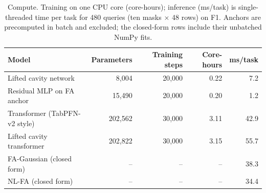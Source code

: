 \begin{table}[h]
\centering\small
\caption{\label{tab:compute}Compute. Training on one CPU core (core-hours); inference (ms/task) is single-threaded time per task for 480 queries (ten masks $\times$ 48 rows) on F1. Anchors are precomputed in batch and excluded; the closed-form rows include their unbatched NumPy fits.}
\begin{tabular}{lrrrr}
\toprule
Model & Parameters & Training steps & Core-hours & ms/task\\
\midrule
Lifted cavity network & 8{,}004 & 20{,}000 & 0.22 & 7.2\\
Residual MLP on FA anchor & 15{,}490 & 20{,}000 & 0.20 & 1.2\\
Transformer (TabPFN-v2 style) & 202{,}562 & 30{,}000 & 3.11 & 42.9\\
Lifted cavity transformer & 202{,}822 & 30{,}000 & 3.15 & 55.7\\
FA-Gaussian (closed form) & -- & -- & -- & 38.3\\
NL-FA (closed form) & -- & -- & -- & 34.4\\
\bottomrule
\end{tabular}
\end{table}
